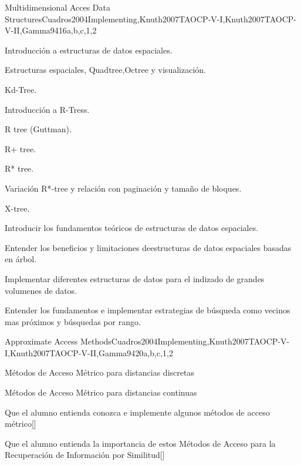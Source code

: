 \begin{syllabus}
\begin{unit}{Multidimensional Acces Data Structures}{}{Cuadros2004Implementing,Knuth2007TAOCP-V-I,Knuth2007TAOCP-V-II,Gamma94}{16}{a,b,c,1,2}
   \begin{topics}
         \item Introducción a estructuras de datos espaciales.
         \item Estructuras espaciales, Quadtree,Octree y visualización.
         \item Kd-Tree.
         \item Introducción a R-Tress.
         \item R tree (Guttman).
         \item R+ tree.
         \item R* tree.
         \item Variación R*-tree y relación con paginación y tamaño de bloques.
         \item X-tree.
   \end{topics}
   \begin{learningoutcomes}
         \item Introducir los fundamentos teóricos de estructuras de datos espaciales.
         \item Entender los beneficios y limitaciones deestructuras de datos espaciales basadas en árbol.
         \item Implementar diferentes estructuras de datos para el indizado de grandes volumenes de datos.
         \item Entender los fundamentos e implementar estrategias de búsqueda como vecinos mas próximos y búsquedas por rango.
   \end{learningoutcomes}
\end{unit}

\begin{unit}{Approximate Access Methods}{}{Cuadros2004Implementing,Knuth2007TAOCP-V-I,Knuth2007TAOCP-V-II,Gamma94}{20}{a,b,c,1,2}
   \begin{topics}
         \item Métodos de Acceso Métrico para distancias discretas
         \item Métodos de Acceso Métrico para distancias continuas
   \end{topics}
   \begin{learningoutcomes}
         \item Que el alumno entienda conozca e implemente algunos métodos de acceso métrico[\Usage]
         \item Que el alumno entienda la importancia de estos Métodos de Acceso para la Recuperación de Información por Similitud[\Usage]
   \end{learningoutcomes}
\end{unit}


\end{syllabus}
